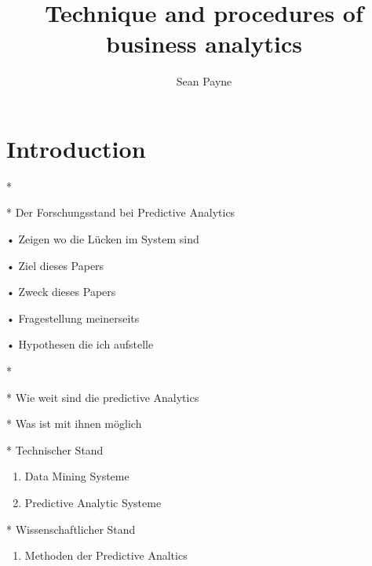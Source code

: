 \documentclass[12pt,twocolumn,twoside]{conference}   %
\title{Technique and procedures of business analytics}
\author{Sean Payne}
\begin{document}

\section{Introduction}
\begin{list}{•}
\item[*] 
\item[*] Der Forschungsstand bei Predictive Analytics
\item[•] Zeigen wo die Lücken im System sind
\item[•] Ziel dieses Papers
\item[•] Zweck dieses Papers
\item[•] Fragestellung meinerseits
\item[•] Hypothesen die ich aufstelle
\end{list}

\begin{list}{•}
\item[*] 
\item[*] Wie weit sind die predictive Analytics
\item[*] Was ist mit ihnen möglich

\item[*] Technischer Stand
	\begin{enumerate}
		\item Data Mining Systeme
		\item Predictive Analytic Systeme
	\end{enumerate}
	
\item[*] Wissenschaftlicher Stand
	\begin{enumerate}
		\item Methoden der Predictive Analtics
	\end{enumerate}
\end{list}
\end{document}
